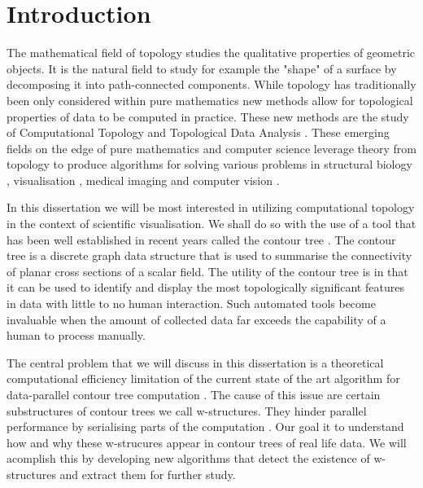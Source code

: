 \chapter{Introduction}
\label{chapter1}

The mathematical field of topology studies the qualitative properties of geometric objects. It is the natural field to study for example the "shape" of a surface by decomposing it into path-connected components. While topology has traditionally been only considered within pure mathematics new methods allow for topological properties of data to be computed in practice. These new methods are the study of Computational Topology \cite{topo-for-computing} and Topological Data Analysis \cite{topo-and-data}. These emerging fields on the edge of pure mathematics and computer science leverage theory from topology to produce algorithms for solving various problems in structural biology \cite{folded-molecules, hemo-globin}, visualisation \cite{topo-hierarchy, fiber-surfaces, flexible-isosurfaces}, medical imaging \cite{reeb-graph-brain} and
computer vision \cite{reeb-shape-analysis, structural-recognition}.


In this dissertation we will be most interested in utilizing computational topology in the context of scientific visualisation. We shall do so with the use of a tool that has been well established in recent years called the contour tree \cite{ct-big-paper}. The contour tree is a discrete graph data structure that is used to summarise the connectivity of planar cross sections of a scalar field. The utility of the contour tree is in that it can be used to identify and display the most topologically significant features in data with little to no human interaction. Such automated tools become invaluable when the amount of collected data far exceeds the capability of a human to process manually.

The central problem that we will discuss in this dissertation is a theoretical computational efficiency limitation of the current state of the art algorithm for data-parallel contour tree computation \cite{parallel-peak-pruning}. The cause of this issue are certain substructures of contour trees we call w-structures. They hinder parallel performance by serialising parts of the computation \cite{pathological-test-cases}. Our goal it to understand how and why these w-strucures appear in contour trees of real life data. We will acomplish this by developing new algorithms that detect the existence of w-structures and extract them for further study.

